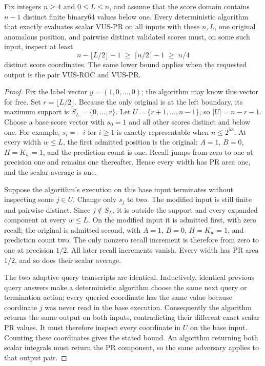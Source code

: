 \begin{theorem}
\label{thm:singleton-query-lower}
Fix integers $n\ge4$ and $0\le L\le n$, and assume that the score domain
contains $n-1$ distinct finite binary64 values below one. Every deterministic
algorithm that exactly evaluates scalar VUS-PR on all inputs with these
$n,L$, one original anomalous position, and pairwise distinct validated
scores must, on some such input, inspect at least
\[
 n-\lfloor L/2\rfloor-1
 \;\ge\;\lceil n/2\rceil-1
 \;\ge\;n/4
\]
distinct score coordinates. The same lower bound applies when the requested
output is the pair VUS-ROC and VUS-PR.
\end{theorem}
\begin{proof}
Fix the label vector $y=(1,0,\ldots,0)$; the algorithm may know this vector
for free. Set $r=\lfloor L/2\rfloor$. Because the only original is at the
left boundary, its maximum support is $S_L=\{0,\ldots,r\}$. Let
$U=\{r+1,\ldots,n-1\}$, so $|U|=n-r-1$. Choose a base score vector with
$s_0=1$ and all other scores distinct and below one. For example,
$s_i=-i$ for $i\ge1$ is exactly representable when $n\le2^{53}$.
At every width $w\le L$, the first admitted position is the original:
$A=1$, $B=0$, $H=K_w=1$, and the prediction count is one. Recall jumps
from zero to one at precision one and remains one thereafter. Hence every
width has PR area one, and the scalar average is one.

Suppose the algorithm's execution on this base input terminates without
inspecting some $j\in U$. Change only $s_j$ to two. The modified input is
still finite and pairwise distinct. Since $j\notin S_L$, it is outside the
support and every expanded component at every $w\le L$. On the modified
input it is admitted first, with zero recall; the original is admitted
second, with $A=1$, $B=0$, $H=K_w=1$, and prediction count two. The only
nonzero recall increment is therefore from zero to one at precision
$1/2$. All later recall increments vanish. Every width has PR area $1/2$,
and so does their scalar average.

The two adaptive query transcripts are identical. Inductively, identical
previous query answers make a deterministic algorithm choose the same next
query or termination action; every queried coordinate has the same value
because coordinate $j$ was never read in the base execution. Consequently
the algorithm returns the same output on both inputs, contradicting their
different exact scalar PR values. It must therefore inspect every coordinate
in $U$ on the base input. Counting these coordinates gives the stated bound.
An algorithm returning both scalar integrals must return the PR component,
so the same adversary applies to that output pair.
\end{proof}


